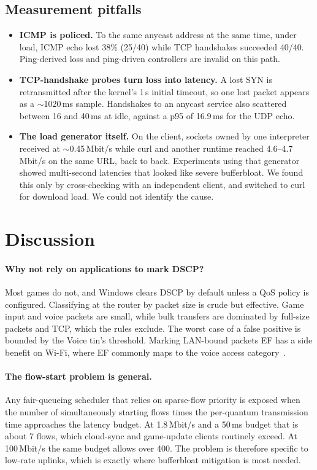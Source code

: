 \documentclass[10pt,twocolumn]{article}
\begin{document}
\subsection{Measurement pitfalls}\label{sec:pitfalls}
\begin{itemize}
\item \textbf{ICMP is policed.} To the same anycast address at the same time,
  under load, ICMP echo lost 38\% (25/40) while TCP handshakes succeeded 40/40.
  Ping-derived loss and ping-driven controllers are invalid on this path.
\item \textbf{TCP-handshake probes turn loss into latency.} A lost SYN is
  retransmitted after the kernel's 1\,s initial timeout, so one lost packet
  appears as a ${\sim}$1020\,ms sample. Handshakes to an anycast service also
  scattered between 16 and 40\,ms at idle, against a p95 of 16.9\,ms for the UDP echo.
\item \textbf{The load generator itself.} On the client, sockets owned by one
  interpreter received at ${\sim}$0.45\,Mbit/s while curl and another runtime
  reached 4.6--4.7\,Mbit/s on the same URL, back to back. Experiments using that
  generator showed multi-second latencies that looked like severe bufferbloat.
  We found this only by cross-checking with an independent client, and switched
  to curl for download load. We could not identify the cause.
\end{itemize}

\section{Discussion}
\paragraph{Why not rely on applications to mark DSCP?} Most games do not,
and Windows clears DSCP by default unless a QoS policy is configured. Classifying
at the router by packet size is crude but effective. Game input and voice
packets are small, while bulk transfers are dominated by full-size packets and
TCP, which the rules exclude. The worst case of a false positive is bounded by
the Voice tin's threshold. Marking LAN-bound packets EF has a side benefit
on Wi-Fi, where EF commonly maps to the voice access category~\cite{rfc8325}.

\paragraph{The flow-start problem is general.} Any fair-queueing scheduler that
relies on sparse-flow priority is exposed when the number of simultaneously
starting flows times the per-quantum transmission time approaches the latency
budget. At 1.8\,Mbit/s and a 50\,ms budget that is about 7 flows, which cloud-sync and
game-update clients routinely exceed. At 100\,Mbit/s the same budget allows over
400. The problem is therefore specific to low-rate uplinks, which is exactly
where bufferbloat mitigation is most needed.
\end{document}
